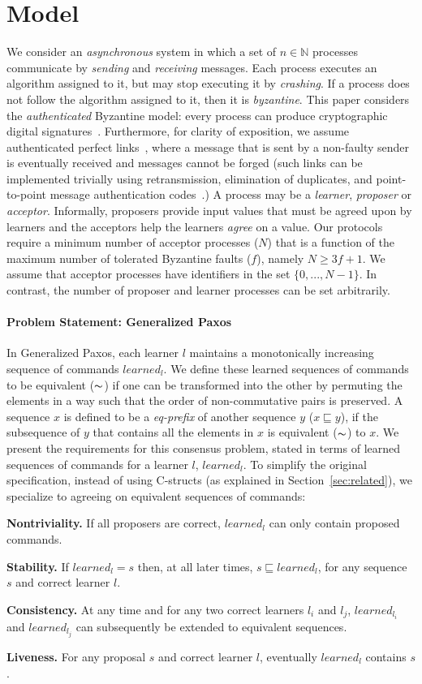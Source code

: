 \section{Model}
\label{sec:model}
%
We consider an \emph{asynchronous} system in which
a set of $n \in \mathbb{N}$ processes communicate by 
\emph{sending} and \emph{receiving} messages.
Each process executes an algorithm assigned to it, but may stop executing it by \emph{crashing}.
If a process does not follow the algorithm assigned to it, then it is \emph{byzantine}.
This paper considers the \emph{authenticated} Byzantine model: every process can produce cryptographic digital signatures~\cite{quorum}. 
Furthermore, for clarity of exposition, we assume authenticated perfect links~\cite{cgr:book}, 
where a message that is sent by a non-faulty sender is eventually received and messages cannot be forged 
(such links can be implemented trivially using retransmission, elimination of duplicates, and point-to-point message authentication codes~\cite{cgr:book}.)
A process may be a \emph{learner}, \emph{proposer} or \emph{acceptor}.
Informally, proposers provide input values that must be agreed upon by learners and the acceptors help the learners \emph{agree} on a value.
Our protocols require a minimum number of acceptor processes ($N$) that is a function of the maximum number of tolerated Byzantine faults ($f$), namely $N \ge 3f+1$. We assume that acceptor processes have identifiers in the set $\{0,...,N-1\}$. In contrast, the number of proposer and learner processes can be set arbitrarily.

\paragraph*{Problem Statement: Generalized Paxos}
In Generalized Paxos, each learner $l$ maintains a monotonically increasing sequence of commands $learned_l$. 
We define these learned sequences of commands to be equivalent ($\thicksim$) 
if one can be transformed into the other by permuting the elements in a way such that the order of non-commutative pairs is preserved. A sequence $x$ is defined to be a \textit{eq-prefix} of another sequence $y$ ($x \sqsubseteq y$), if the subsequence of $y$ that contains all the elements in $x$ is equivalent ($\thicksim$) to $x$. 
We present the requirements for this consensus problem, stated in terms of learned sequences of commands for a learner $l$, $learned_l$. To simplify the original specification, instead of using C-structs (as explained in Section~\ref{sec:related}), we specialize to agreeing on equivalent sequences of commands:\par
\textbf{Nontriviality.} If all proposers are correct, $learned_l$ can only contain proposed commands. \par
\textbf{Stability.} If $learned_l = s$ then, at all later times, $s \sqsubseteq learned_l$, for any sequence $s$ and correct learner $l$. \par
\textbf{Consistency.} At any time and for any two correct learners $l_i$ and $l_j$, $learned_{l_i}$ and $learned_{l_j}$ can subsequently be extended to equivalent sequences.\par
\textbf{Liveness.} For any proposal $s$ and correct learner $l$, eventually $learned_l$ contains $s$.\par
